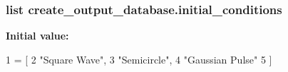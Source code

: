 \hypertarget{namespacecreate__output__database_ac37741634f9cfce4d7b2922385b41ce7}{
\subsubsection[{initial\-\_\-conditions}]{\setlength{\rightskip}{0pt plus 5cm}list create\-\_\-output\-\_\-database.\-initial\-\_\-conditions}}\label{namespacecreate__output__database_ac37741634f9cfce4d7b2922385b41ce7}
{\bfseries Initial value\-:}
\begin{DoxyCode}
1 = [
2     \textcolor{stringliteral}{"Square Wave"}, 
3     \textcolor{stringliteral}{"Semicircle"}, 
4     \textcolor{stringliteral}{"Gaussian Pulse"}
5 ]
\end{DoxyCode}

